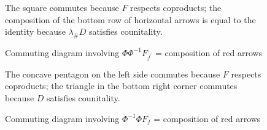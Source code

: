 \begin{landscape}
\begin{figure}
{{}}
\caption{Commuting diagram 
involving $\Phi\Phi^{-1}F_{f^\prime}$
= composition of red arrows}
  \label{fig:phi_phi-1}
The square commutes because $F$ 
respects coproducts; 
the composition of the bottom row 
of horizontal arrows is equal to 
the identity because $\lambda_\#D$ 
satisfies counitality.
\end{figure}
%
\begin{figure}
\centerline{
\xymatrixrowsep{5pc}
\xymatrixcolsep{5pc}
}
\caption{Commuting diagram 
involving $\Phi^{-1}\Phi F_f$
= composition of red arrows}
  \label{fig:phi-id_phi}
The concave pentagon on the left 
side commutes because $F$ 
respects coproducts; the triangle in the 
bottom right corner commutes 
because $D$ satisfies counitality.
\end{figure}
\end{landscape}